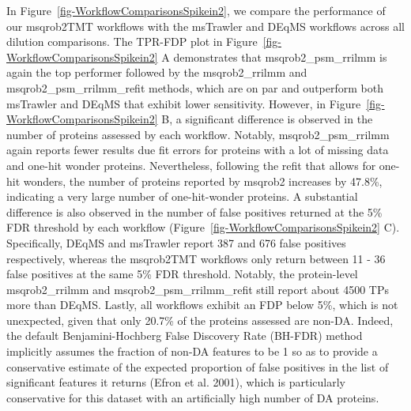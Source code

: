 \documentclass[
  letterpaper,
  DIV=11,
  numbers=noendperiod]{scrartcl}
\begin{document}
In Figure~\ref{fig-WorkflowComparisonsSpikein2}, we compare the
performance of our msqrob2TMT workflows with the msTrawler and DEqMS
workflows across all dilution comparisons. The TPR-FDP plot in
Figure~\ref{fig-WorkflowComparisonsSpikein2} A demonstrates that
msqrob2\_psm\_rrilmm is again the top performer followed by the
msqrob2\_rrilmm and msqrob2\_psm\_rrilmm\_refit methods, which are on
par and outperform both msTrawler and DEqMS that exhibit lower
sensitivity. However, in Figure~\ref{fig-WorkflowComparisonsSpikein2} B,
a significant difference is observed in the number of proteins assessed
by each workflow. Notably, msqrob2\_psm\_rrilmm again reports fewer
results due fit errors for proteins with a lot of missing data and
one-hit wonder proteins. Nevertheless, following the refit that allows
for one-hit wonders, the number of proteins reported by msqrob2
increases by 47.8\%, indicating a very large number of one-hit-wonder
proteins. A substantial difference is also observed in the number of
false positives returned at the 5\% FDR threshold by each workflow
(Figure~\ref{fig-WorkflowComparisonsSpikein2} C). Specifically, DEqMS
and msTrawler report 387 and 676 false positives respectively, whereas
the msqrob2TMT workflows only return between 11 - 36 false positives at
the same 5\% FDR threshold. Notably, the protein-level msqrob2\_rrilmm
and msqrob2\_psm\_rrilmm\_refit still report about 4500 TPs more than
DEqMS. Lastly, all workflows exhibit an FDP below 5\%, which is not
unexpected, given that only 20.7\% of the proteins assessed are non-DA.
Indeed, the default Benjamini-Hochberg False Discovery Rate (BH-FDR)
method implicitly assumes the fraction of non-DA features to be 1 so as
to provide a conservative estimate of the expected proportion of false
positives in the list of significant features it returns (Efron et al.
2001), which is particularly conservative for this dataset with an
artificially high number of DA proteins.
\end{document}
